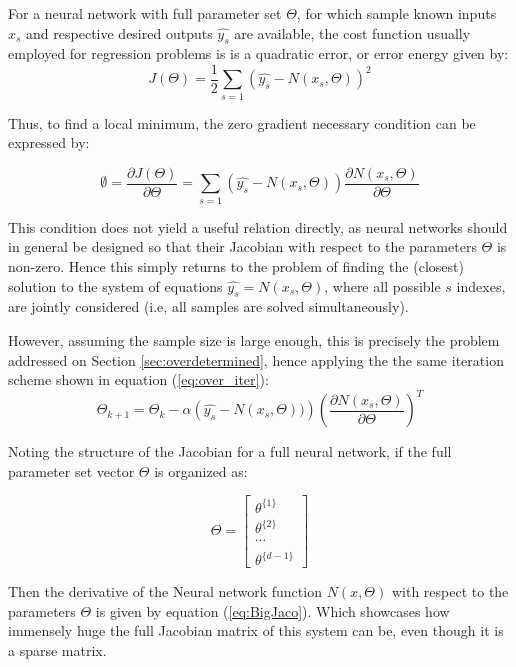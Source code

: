 \documentclass[10pt,journal,compsoc]{IEEEtran}
\newcommand{\ce}[1]{equation (\ref{#1})}
\newcommand{\cs}[1]{Section \ref{#1}}
\newcommand{\pd}[2]{\frac{\partial #1}{\partial #2}}
\begin{document}
For a neural network with full parameter set $\Theta$, for which sample known inputs $x_s$ and respective desired outputs $\widehat{y_s}$ are available, the cost function usually employed for regression problems is is a quadratic error, or error energy given by:
\begin{equation}
	J(\Theta) = \frac{1}{2} \sum_{s=1} \left( \widehat{y_s} - N(x_s, \Theta) \right)^2
\end{equation}

Thus, to find a local minimum, the zero gradient necessary condition can be expressed by:

\begin{equation}
	\emptyset = \pd{J(\Theta)}{\Theta} = \sum_{s=1} \left( \widehat{y_s} - N(x_s, \Theta) \right) \pd{N(x_s, \Theta)}{\Theta}
\end{equation}

This condition does not yield a useful relation directly, as neural networks should in general be designed so that their Jacobian with respect to the parameters $\Theta$ is non-zero. Hence this simply returns to the problem of finding the (closest) solution to the system of equations $\widehat{y_s} = N(x_s, \Theta) $, where all possible $s$ indexes, are jointly considered (i.e, all samples are solved simultaneously).

However, assuming the sample size is large enough, this is precisely the problem addressed on \cs{sec:overdetermined}, hence applying the the same iteration scheme shown in \ce{eq:over_iter}:
\begin{equation} 
	\Theta_{k+1} = \Theta_k -\alpha \left(\widehat{y_s}-N(x_s, \Theta))\right) \left( \pd{N(x_s, \Theta)}{\Theta}\right)^T
\end{equation}

Noting the structure of the Jacobian for a full neural network, if the full parameter set vector $\Theta$ is organized as:

\begin{equation}
	\Theta = \begin{bmatrix}
				\theta^{\{ 1 \}} \\
				\theta^{\{ 2 \}} \\
				\cdots \\
				\theta^{\{ d-1 \}}
	\end{bmatrix}
\end{equation}

Then the derivative of the Neural network function $N(x,\Theta)$ with respect to the parameters $\Theta$ is given by \ce{eq:BigJaco}. Which showcases how immensely huge the full Jacobian matrix of this system can be, even though it is a sparse matrix.
\end{document}
